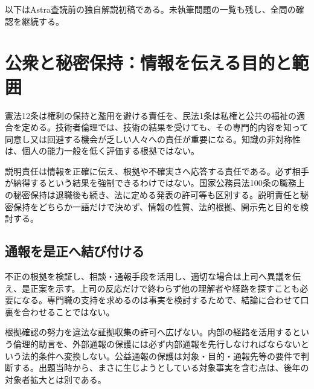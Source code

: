 以下はAstra査読前の独自解説初稿である。未執筆問題の一覧も残し、全問の確認を継続する。
\section{公衆と秘密保持：情報を伝える目的と範囲}
\label{theory:compliance:public_information}
憲法12条は権利の保持と濫用を避ける責任を、民法1条は私権と公共の福祉の適合を定める\parencite{jp_constitution,jp_civil}。技術者倫理では、技術の結果を受けても、その専門的内容を知って同意し又は回避する機会が乏しい人々への責任が重要になる。知識の非対称性は、個人の能力一般を低く評価する根拠ではない。

説明責任は情報を正確に伝え、根拠や不確実さへ応答する責任である。必ず相手が納得するという結果を強制できるわけではない。国家公務員法100条の職務上の秘密保持は退職後も続き、法に定める発表の許可等も区別する\parencite{jp_national_public}。説明責任と秘密保持をどちらか一語だけで決めず、情報の性質、法的根拠、開示先と目的を検討する。

\subsection{通報を是正へ結び付ける}
不正の根拠を検証し、相談・通報手段を活用し、適切な場合は上司へ異議を伝え、是正案を示す。上司の反応だけで終わらず他の理解者や経路を探すことも必要になる。専門職の支持を求めるのは事実を検討するためで、結論に合わせて口裏を合わせることではない。

根拠確認の努力を違法な証拠収集の許可へ広げない。内部の経路を活用するという倫理的助言を、外部通報の保護には必ず内部通報を先行しなければならないという法的条件へ変換しない。公益通報の保護は対象・目的・通報先等の要件で判断する。出題当時から、まさに生じようとしている対象事実を含む点は、後年の対象者拡大とは別である\parencite{caa_handbook_pre2022,caa_current_faq}。







